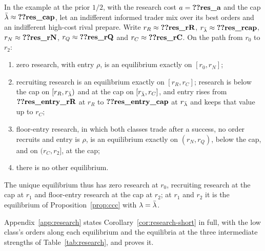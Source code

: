 \begin{corollary}\label{cor:research-short}
In the example at the prior \(1/2\), with the research cost \(a=\reg{res_a}\) and the cap \(\lb\approx\reg{res_cap}\), let
an indifferent informed trader mix over its best orders and an indifferent high-cost rival prepare. Write
\(r_R\approx\reg{res_rR}\), \(r_{\lb}\approx\reg{res_rcap}\), \(r_N\approx\reg{res_rN}\),
\(r_Q\approx\reg{res_rQ}\) and \(r_C\approx\reg{res_rC}\). On the path from \(r_0\) to \(r_2\):
\begin{enumerate}[label=(\roman*),leftmargin=2em]
\item zero research, with entry \(\rho\), is an equilibrium exactly on \([r_0,r_N]\);
\item recruiting research is an equilibrium exactly on \([r_R,r_C]\); research is below the cap on \([r_R,r_{\bar\lambda})\)
and at the cap on \([r_{\bar\lambda},r_C]\), and entry rises from \(\reg{res_entry_rR}\) at \(r_R\) to
\(\reg{res_entry_cap}\) at \(r_{\bar\lambda}\) and keeps that value up to \(r_C\);
\item floor-entry research, in which both classes trade after a success, no order recruits and entry is \(\rho\), is
an equilibrium exactly on \((r_N,r_Q)\), below the cap, and on \((r_C,r_2]\), at the cap;
\item there is no other equilibrium.
\end{enumerate}
The unique equilibrium thus has zero research at \(r_0\), recruiting research at the cap at \(r_1\) and floor-entry
research at the cap at \(r_2\); at \(r_1\) and \(r_2\) it is the equilibrium of Proposition~\ref{prop:ccc} with
\(\lambda=\bar\lambda\).
\end{corollary}

Appendix~\ref{app:research} states Corollary~\ref{cor:research-short} in full, with the low class's orders along each
equilibrium and the equilibria at the three intermediate strengths of Table~\ref{tab:research}, and proves it.


